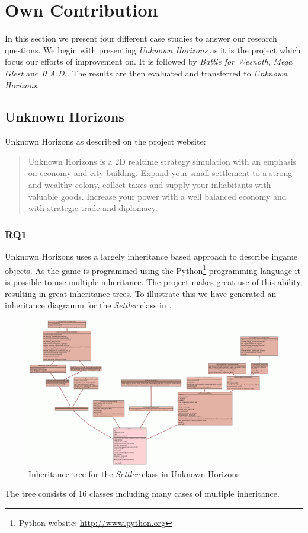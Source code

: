 \section{Own Contribution}
In this section we present four different case studies to answer our research questions. We begin with presenting
\textit{Unknown Horizons} as it is the project which focus our efforts of improvement on. It is followed by \textit{Battle for
Wesnoth}, \textit{Mega Glest} and \textit{0 A.D.}.
The results are then evaluated and transferred to \textit{Unknown Horizons}.

\subsection{Unknown Horizons}
Unknown Horizons as described on the project website:
\begin{quote}
Unknown Horizons is a 2D realtime strategy simulation with an emphasis on economy and city building. Expand your small settlement to a strong and wealthy colony, collect taxes and supply your inhabitants with valuable goods. Increase your power with a well balanced economy and with strategic trade and diplomacy.
\end{quote}

\subsubsection{RQ1}
Unknown Horizons uses a largely inheritance based approach to describe ingame objects. As the game is programmed using
the Python\footnote{Python website: \url{http://www.python.org}} programming language it is possible to use multiple
inheritance. The project makes great use of this ability, resulting in great inheritance trees. To illustrate this we
have generated an inheritance diagramm for the \textit{Settler} class in . 
\begin{figure}[!htb]
\includegraphics[angle=90,scale=0.25]{pics/settler_uml}
\caption{Inheritance tree for the \textit{Settler} class in Unknown Horizons}
\label{fig:settleruml}
\end{figure}
The tree consists of 16 classes including many cases of multiple inheritance. 

